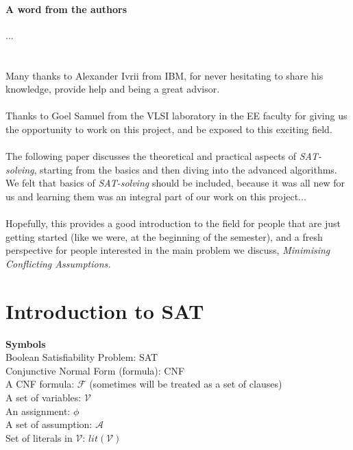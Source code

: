 \documentclass[]{article}
\begin{document}
	\pagebreak
	\paragraph{A word from the authors} ...\\\\\\
		Many thanks to Alexander Ivrii from IBM, for never hesitating to share his knowledge, provide help and being a great advisor.\\\\
		Thanks to Goel Samuel from the VLSI laboratory in the EE faculty for giving us the opportunity to work on this project, and be exposed to this exciting field.\\ \\
		The following paper discusses the theoretical and practical aspects of \textit{SAT-solving}, starting from the basics and then diving into the advanced algorithms. We felt that basics of \textit{SAT-solving} should be included, because it was all new for us and learning them was an integral part of our work on this project...\\\\Hopefully, this provides a good introduction to the field for people that are just getting started (like we were, at the beginning of the semester), and a fresh perspective for people interested in the main problem we discuss,\textit{ Minimising Conflicting Assumptions.}
		
	\pagebreak
	
	\tableofcontents
	\pagebreak
	\section{Introduction to SAT}
	\textbf{Symbols} \\
	Boolean Satisfiability Problem: SAT \\
	Conjunctive Normal Form (formula): CNF \\
	A CNF formula: $ \mathcal{F} $ (sometimes will be treated as a set of clauses) \\
	A set of variables: $ \mathcal{V} $ \\
	An assignment: $ \phi $ \\
	A set of assumption: $ \mathcal{A} $ \\
	Set of literals in $ \mathcal{V} $: $ lit(\mathcal{V}) $
\end{document}
